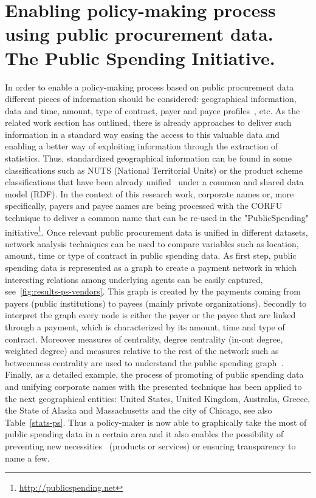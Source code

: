 \documentclass[1p,12pt]{elsarticle}
\begin{document}
\section{Enabling policy-making process using public procurement data. The Public Spending Initiative.}
In order to enable a policy-making process based on public procurement data different pieces of information should be considered: geographical information, data and time, amount, type of contract, payer and payee profiles~\citep{DBLP:journals/eswa/SenthilSR14}, etc. As the related work section has outlined, there is already approaches to deliver such information in a standard way easing the access to this valuable data and enabling a better way of exploiting information through the extraction of statistics. Thus, standardized geographical information can be found in some classifications such as NUTS (National Territorial Units) or the product scheme classifications that have been already unified~\citep{DBLP:journals/chb/RodriguezGGP14} under a common and shared data model (RDF). In the context of this research work, corporate names or, more specifically, payers and payee names are being processed with the CORFU technique to deliver a common name that can be re-used in the "PublicSpending" initiative\footnote{\url{http://publicspending.net}}. Once relevant public procurement data is unified in different datasets, network analysis techniques can be used to compare variables such as location, amount, time or type of contract in public spending data. As first step, public spending data is represented as a graph to create a payment network in which interesting relations among underlying agents can be easily captured, see~\ref{fig:results-ps-vendors}. This graph is created by the payments coming from payers (public institutions) to payees (mainly private organizations). Secondly to interpret the graph every node is either the payer or the payee that are linked through a payment, which is characterized by its amount, time and type of contract. Moreover measures of centrality, degree centrality (in-out degree, weighted degree) and measures relative to the rest of the network such as betweenness centrality are used to understand the public spending graph~\citep{DBLP:journals/eswa/IraniSKL14,DBLP:journals/eswa/WangZL13}. Finally, as a detailed example, the process of promoting of public spending data and unifying corporate names with the presented technique has been applied to the next geographical entities: United States, United Kingdom, Australia, Greece, the State of Alaska and Massachusetts and the city of Chicago, see also Table~\ref{stats-ps}. Thus a policy-maker is now able to graphically take the most of public spending data in a certain area and it also enables the possibility of preventing new necessities~\citep{DBLP:journals/eswa/MusaGY14} (products or services) or ensuring transparency to name a few.
\end{document}
